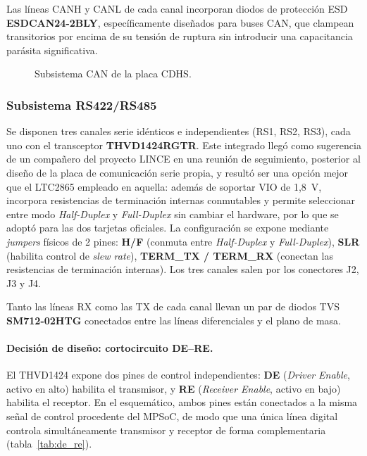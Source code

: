 Las líneas CANH y CANL de cada canal incorporan diodos de protección ESD
\textbf{ESDCAN24-2BLY}, específicamente diseñados para buses CAN, que clampean transitorios
por encima de su tensión de ruptura sin introducir una capacitancia parásita significativa.

\begin{figure}[H]
    \centering
    \caption{Subsistema CAN de la placa CDHS.}
    \label{fig:cdhs_can}
\end{figure}

\subsubsection{Subsistema RS422/RS485}

Se disponen tres canales serie idénticos e independientes (RS1, RS2, RS3), cada uno con el
transceptor \textbf{THVD1424RGTR}. Este integrado llegó como sugerencia de un compañero del
proyecto LINCE en una reunión de seguimiento, posterior al diseño de la placa de comunicación
serie propia, y resultó ser una opción mejor que el LTC2865 empleado en aquella: además de
soportar VIO de 1,8~V, incorpora resistencias de terminación internas conmutables y permite
seleccionar entre modo \textit{Half-Duplex} y \textit{Full-Duplex} sin cambiar el hardware, por
lo que se adoptó para las dos tarjetas oficiales. La configuración se expone mediante
\textit{jumpers} físicos de 2 pines: \textbf{H/F} (conmuta entre \textit{Half-Duplex} y \textit{Full-Duplex}), \textbf{SLR}
(habilita control de \textit{slew rate}), \textbf{TERM\_TX / TERM\_RX} (conectan las resistencias de
terminación internas). Los tres canales salen por los conectores J2, J3 y J4.

Tanto las líneas RX como las TX de cada canal llevan un par de diodos TVS
\textbf{SM712-02HTG} conectados entre las líneas diferenciales y el plano de masa.

\paragraph{Decisión de diseño: cortocircuito DE--RE.}
El THVD1424 expone dos pines de control independientes: \textbf{DE} (\textit{Driver Enable}, activo en
alto) habilita el transmisor, y \textbf{RE} (\textit{Receiver Enable}, activo en bajo) habilita el receptor.
En el esquemático, ambos pines están conectados a la misma señal de control procedente del
MPSoC, de modo que una única línea digital controla simultáneamente transmisor y receptor
de forma complementaria (tabla~\ref{tab:de_re}).

